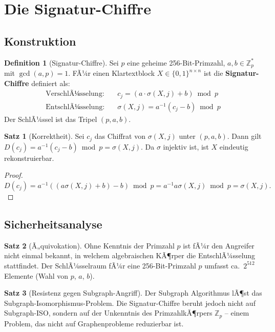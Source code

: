 ﻿\documentclass[a4paper,12pt]{scrreprt}
\theoremstyle{definition}
\newtheorem{definition}{Definition}[section]
\newtheorem{satz}{Satz}[section]
\begin{document}
\section{Die Signatur-Chiffre}

\subsection{Konstruktion}

\begin{definition}[Signatur-Chiffre]
  Sei $p$ eine geheime 256-Bit-Primzahl, $a,b\in\mathbb{Z}_p^*$ mit
  $\gcd(a,p)=1$. FÃ¼r einen Klartextblock $X \in \{0,1\}^{n\times n}$
  ist die \textbf{Signatur-Chiffre} definiert als:
  \begin{align*}
    \text{VerschlÃ¼sselung:} &\quad c_j = (a \cdot \sigma(X,j) + b) \bmod p \\
    \text{EntschlÃ¼sselung:} &\quad \sigma(X,j) = a^{-1}(c_j - b) \bmod p
  \end{align*}
  Der SchlÃ¼ssel ist das Tripel $(p, a, b)$.
\end{definition}

\begin{satz}[Korrektheit]
  Sei $c_j$ das Chiffrat von $\sigma(X,j)$ unter $(p,a,b)$. Dann gilt
  $D(c_j) = a^{-1}(c_j-b)\bmod p = \sigma(X,j)$. Da $\sigma$ injektiv
  ist, ist $X$ eindeutig rekonstruierbar.
\end{satz}

\begin{proof}
  $D(c_j) = a^{-1}((a\sigma(X,j)+b)-b)\bmod p
  = a^{-1} a \sigma(X,j)\bmod p = \sigma(X,j).$
\end{proof}

\subsection{Sicherheitsanalyse}

\begin{satz}[Ã„quivokation]
  Ohne Kenntnis der Primzahl $p$ ist fÃ¼r den Angreifer nicht einmal
  bekannt, in welchem algebraischen KÃ¶rper die EntschlÃ¼sselung stattfindet.
  Der SchlÃ¼sselraum fÃ¼r eine 256-Bit-Primzahl $p$ umfasst ca.\ $2^{512}$
  Elemente (Wahl von $p$, $a$, $b$).
\end{satz}

\begin{satz}[Resistenz gegen Subgraph-Angriff]
  Der Subgraph Algorithmus lÃ¶st das Subgraph-Isomorphismus-Problem.
  Die Signatur-Chiffre beruht jedoch nicht auf Subgraph-ISO, sondern
  auf der Unkenntnis des PrimzahlkÃ¶rpers $\mathbb{Z}_p$ -- einem Problem,
  das nicht auf Graphenprobleme reduzierbar ist.
\end{satz}
\end{document}
